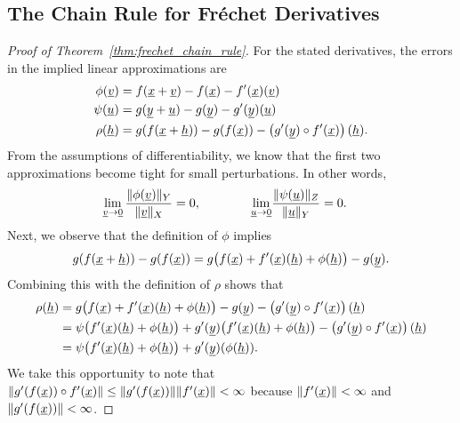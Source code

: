 \subsection*{The Chain Rule for Fr\'echet Derivatives}
\begin{proof}[Proof of Theorem~\ref{thm:frechet_chain_rule}]
For the stated derivatives, the errors in the implied linear approximations are 
\begin{align*}
\phi(\underline{v}) &= f(\underline{x} + \underline{v})-f(\underline{x}) - f'(\underline{x})(\underline{v}) \\
\psi(\underline{u}) &= g(\underline{y} + \underline{u})-g(\underline{y}) - g'(\underline{y})(\underline{u}) \\
\rho(\underline{h}) &= g(f(\underline{x} + \underline{h})) -g(f(\underline{x})) - \left( g'(\underline{y}) \circ f'(\underline{x})\right) (\underline{h}).
\end{align*}
From the assumptions of differentiability, we know that the first two approximations become tight for small perturbations.
In other words,
\begin{align*}
\lim_{\underline{v} \to \underline{0}} \frac{\| \phi (\underline{v}) \|_Y}{\|\underline{v}\|_X} = 0,  \quad\quad\quad\quad \lim_{\underline{u} \to \underline{0}} & \frac{\| \psi (\underline{u})\|_Z}{\|\underline{u}\|_Y} = 0.
\end{align*}
Next, we observe that the definition of $\phi$ implies
\[ g(f(\underline{x} + \underline{h})) -g(f(\underline{x})) = g \big( f(\underline{x}) + f'(\underline{x})(\underline{h}) + \phi(\underline{h}) \big) - g(\underline{y}). \]
Combining this with the definition of $\rho$ shows that
\begin{align*}
\rho(\underline{h}) &= g \big( f(\underline{x}) + f'(\underline{x})(\underline{h}) + \phi(\underline{h}) \big) - g(\underline{y}) - \left( g'(\underline{y}) \circ f'(\underline{x})\right) (\underline{h}) \\
&= \psi \big(f'(\underline{x})(\underline{h}) + \phi(\underline{h}) \big) + g'(\underline{y})\big( f'(\underline{x})(\underline{h}) + \phi(\underline{h}) \big) - \left( g'(\underline{y}) \circ f'(\underline{x})\right) (\underline{h}) \\
&= \psi \big(f'(\underline{x})(\underline{h}) + \phi(\underline{h}) \big) + g'(\underline{y})(\phi(\underline{h})).
\end{align*}
We take this opportunity to note that $\|g'(f(\underline{x}))\circ f'(\underline{x})\| \leq \|g'(f(\underline{x}))\| \|f'(\underline{x})\| < \infty$ because $\|f'(\underline{x})\| < \infty$ and $\|g'(f(\underline{x}))\| <\infty$. 


\end{proof}
